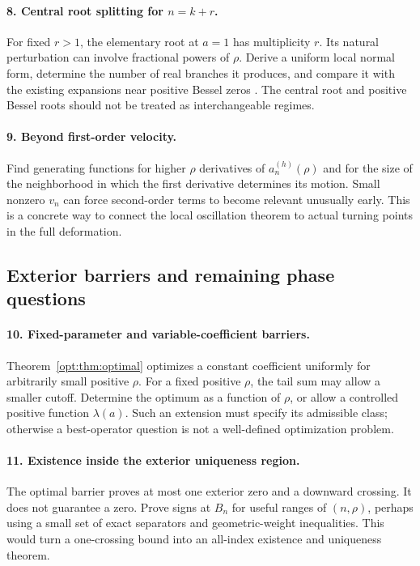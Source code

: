 \documentclass[11pt,a4paper]{article}
\theoremstyle{definition}
\theoremstyle{remark}
\numberwithin{equation}{section}
\begin{document}
\paragraph{8. Central root splitting for $n=k+r$.}
For fixed $r>1$, the elementary root at $a=1$ has multiplicity $r$.
Its natural perturbation can involve fractional powers of $\rho$.
Derive a uniform local normal form, determine the number of real
branches it produces, and compare it with the existing expansions
near positive Bessel zeros \cite{IncomingBessel}. The central root
and positive Bessel roots should not be treated as interchangeable
regimes.

\paragraph{9. Beyond first-order velocity.}
Find generating functions for higher $\rho$ derivatives of
$a_n^{(h)}(\rho)$ and for the size of the neighborhood in which
the first derivative determines its motion. Small nonzero
$v_n$ can force second-order terms to become relevant unusually early.
This is a concrete way to connect the local oscillation theorem
to actual turning points in the full deformation.

\subsection{Exterior barriers and remaining phase questions}

\paragraph{10. Fixed-parameter and variable-coefficient barriers.}
Theorem~\ref{opt:thm:optimal} optimizes a constant coefficient uniformly
for arbitrarily small positive $\rho$. For a fixed positive $\rho$, the tail sum may allow
a smaller cutoff. Determine the optimum as a function of $\rho$,
or allow a controlled positive function $\lambda(a)$.
Such an extension must specify its admissible class; otherwise a
best-operator question is not a well-defined optimization problem.

\paragraph{11. Existence inside the exterior uniqueness region.}
The optimal barrier proves at most one exterior zero and a downward
crossing. It does not guarantee a zero. Prove signs at $B_n$ for useful
ranges of $(n,\rho)$, perhaps using a small set of exact separators
and geometric-weight inequalities. This would turn a one-crossing
bound into an all-index existence and uniqueness theorem.
\end{document}
